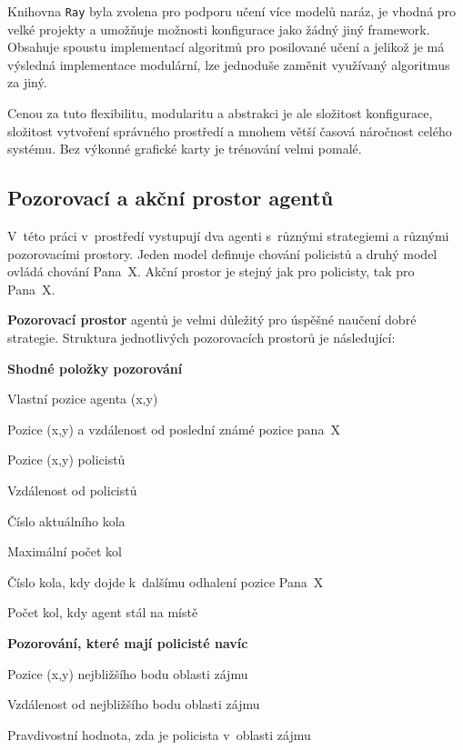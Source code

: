 Knihovna \texttt{Ray} byla zvolena pro podporu učení více modelů naráz, je vhodná pro velké projekty a umožňuje možnosti konfigurace jako žádný jiný framework.
Obsahuje spoustu implementací algoritmů pro posilované učení a jelikož je má výsledná implementace modulární, lze jednoduše zaměnit využívaný algoritmus za jiný.

Cenou za tuto flexibilitu, modularitu a abstrakci je ale složitost konfigurace, složitost vytvoření správného prostředí a mnohem větší časová náročnost celého systému.
Bez výkonné grafické karty je trénování velmi pomalé.

\subsection{Pozorovací a akční prostor agentů}
V~této práci v~prostředí vystupují dva agenti s~různými strategiemi a různými pozorovacími prostory.
Jeden model definuje chování policistů a druhý model ovládá chování Pana~X\@.
Akční prostor je stejný jak pro policisty, tak pro Pana~X\@.

\bigskip
\textbf{Pozorovací prostor} agentů je velmi důležitý pro úspěšné naučení dobré strategie.
Struktura jednotlivých pozorovacích prostorů je následující:

\begin{myitemize}
  \item \textbf{Shodné položky pozorování}
    \begin{myitemize}
    \item Vlastní pozice agenta (x,y)
    \item Pozice (x,y) a vzdálenost od poslední známé pozice pana~X
    \item Pozice (x,y) policistů
    \item Vzdálenost od  policistů
    \item Číslo aktuálního kola
    \item Maximální počet kol
    \item Číslo kola, kdy dojde k~dalšímu odhalení pozice Pana~X
    \item Počet kol, kdy agent stál na místě
  \end{myitemize}
  \item \textbf{Pozorování, které mají policisté navíc}
    \begin{myitemize}
    \item Pozice (x,y) nejbližšího bodu oblasti zájmu
    \item Vzdálenost od nejbližšího bodu oblasti zájmu
    \item Pravdivostní hodnota, zda je policista v~oblasti zájmu
  \end{myitemize}
\end{myitemize}

